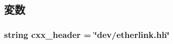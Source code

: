 \subsection{変数}
\hypertarget{classEthernet_1_1EtherLink_a17da7064bc5c518791f0c891eff05fda}{
\subsubsection[{cxx\_\-header}]{\setlength{\rightskip}{0pt plus 5cm}string {\bf cxx\_\-header} = \char`\"{}dev/etherlink.hh\char`\"{}}}
\label{classEthernet_1_1EtherLink_a17da7064bc5c518791f0c891eff05fda}


